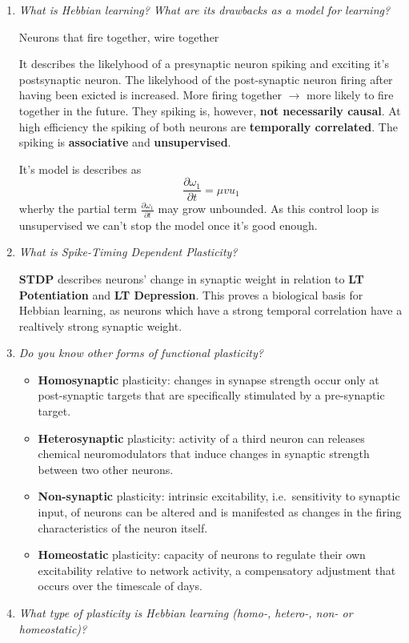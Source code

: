 \documentclass[
    fontsize      = 11pt,
    paper         = a4,
    twoside       = false,
    parskip       = half,
    pagesize      = false,
]{scrartcl}
\providecommand{\tightlist}{%
  \setlength{\itemsep}{0pt}\setlength{\parskip}{0pt}}
\begin{document}
\begin{enumerate}
  \textbf{LTD}: If the synapse is, however, understimulated for a long
  time (very few pulses, low frequency), it will reduce the ammount of
  neuroreceptors at the post-synaptic neuron essentially
  \glqq weakening\grqq the conection. The \emph{fEPSP} slope decreases.

  \textbf{(?)}
\item
  \emph{What is Hebbian learning? What are its drawbacks as a model for
  learning?}

  \glqq Neurons that fire together, wire together \grqq

  It describes the likelyhood of a presynaptic neuron spiking and
  exciting it's postsynaptic neuron. The likelyhood of the post-synaptic
  neuron firing after having been exicted is increased. More firing
  together \(\rightarrow\) more likely to fire together in the future.
  They spiking is, however, \textbf{not necessarily causal}. At high
  efficiency the spiking of both neurons are \textbf{temporally
  correlated}. The spiking is \textbf{associative} and
  \textbf{unsupervised}.

  It's model is describes as
  \[\frac{\partial \omega_1}{\partial t} = \mu v u_1\] wherby the
  partial term \(\frac{\partial \omega_1}{\partial t}\) may grow
  unbounded. As this control loop is unsupervised we can't stop the
  model once it's \glqq good enough\grqq.
\item
  \emph{What is Spike-Timing Dependent Plasticity?}

  \textbf{STDP} describes neurons' change in synaptic weight in relation
  to \textbf{LT Potentiation} and \textbf{LT Depression}. This proves a
  biological basis for Hebbian learning, as neurons which have a strong
  temporal correlation have a realtively strong synaptic weight.
\item
  \emph{Do you know other forms of functional plasticity?}

  \begin{itemize}
  \tightlist
  \item
    \textbf{Homosynaptic} plasticity: changes in synapse strength occur
    only at post-synaptic targets that are specifically stimulated by a
    pre-synaptic target.
  \item
    \textbf{Heterosynaptic} plasticity: activity of a third neuron can
    releases chemical neuromodulators that induce changes in synaptic
    strength between two other neurons.
  \item
    \textbf{Non-synaptic} plasticity: intrinsic excitability,
    i.e.~sensitivity to synaptic input, of neurons can be altered and is
    manifested as changes in the firing characteristics of the neuron
    itself.
  \item
    \textbf{Homeostatic} plasticity: capacity of neurons to regulate
    their own excitability relative to network activity, a compensatory
    adjustment that occurs over the timescale of days.
  \end{itemize}
\item
  \emph{What type of plasticity is Hebbian learning (homo-, hetero-,
  non- or homeostatic)?}


\end{enumerate}
\end{document}
